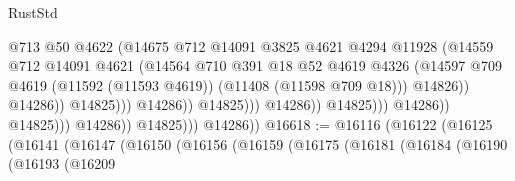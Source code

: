 \begin{lexlean}{RustStd}
\begin{coremodule}
                                                        @713
                                                        @50
                                                        @4622
                                                        (@14675
                                                          @712
                                                          @14091
                                                          @3825
                                                          @4621
                                                          @4294
                                                          @11928
                                                          (@14559
                                                            @712
                                                            @14091
                                                            @4621
                                                            (@14564
                                                              @710
                                                              @391
                                                              @18
                                                              @52
                                                              @4619
                                                              @4326
                                                              (@14597
                                                                @709
                                                                @4619
                                                                (@11592 (@11593 @4619))
                                                                (@11408 (@11598 @709 @18)))
                                                              @14826))
                                                          @14286))
                                                      @14825)))
                                                @14286))
                                            @14825)))
                                      @14286))
                                  @14825)))
                            @14286))
                        @14825)))
                  @14286))
              @14825)))
        @14286))
@16618 := @16116
    (@16122
      (@16125
        (@16141
          (@16147
            (@16150
              (@16156
                (@16159
                  (@16175
                    (@16181
                      (@16184
                        (@16190
                          (@16193
                            (@16209

\end{coremodule}
\end{lexlean}
